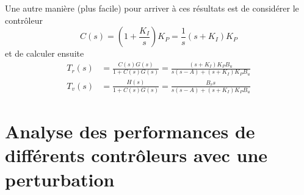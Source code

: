 \documentclass[frenchb, paper=a4, fontsize=11pt]{scrartcl}
\numberwithin{equation}{section}					%
\numberwithin{figure}{section}					%
\numberwithin{table}{section}						%
\begin{document}
Une autre manière (plus facile) pour arriver à ces résultats est de considérer le contrôleur 
\begin{equation}
C(s) = (1+\frac{K_I}{s})K_P = \frac{1}{s}(s+K_I)K_P
\end{equation}
et de calculer ensuite
\begin{align}
T_r(s) &= \frac{C(s)G(s)}{1+C(s)G(s)} = \frac{(s+K_I)K_P B_u}{s(s-A)+(s+K_I)K_P B_u}\\
T_v(s) &= \frac{H(s)}{1+C(s)G(s)} = \frac{B_v s}{s(s-A)+(s+K_I)K_P B_u}
\end{align}

\section{Analyse des performances de différents contrôleurs avec une perturbation}
\end{document}
